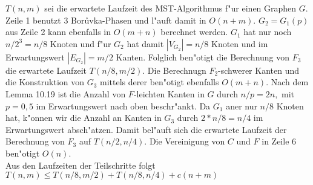 $T(n,m)$ sei die erwartete Laufzeit des MST-Algorithmus f"ur einen Graphen $G$.
    Zeile 1 benutzt 3 Bor\r uvka-Phasen und  l"auft damit in $O(n+m)$. 
    $G_2 = G_1(p)$ aus Zeile 2 kann ebenfalls in $O(m + n)$ berechnet werden.
    $G_1$ hat nur noch $n/2^3 = n/8$ Knoten und f"ur $G_2$ hat damit 
    $|V_{G_2}| = n/8$ Knoten und im Erwartungswert $|E_{G_2}| = m/2$ Kanten.
    Folglich ben"otigt die Berechnung von $F_3$  die erwartete Laufzeit 
    $T(n/8,m/2)$.
    Die Berechnugn $F_2$-schwerer Kanten und die Konstruktion von $G_3$ mittels
    derer ben"otigt ebenfalls $O(m+n)$.
    Nach dem Lemma 10.19 ist die Anzahl von $F$-leichten Kanten in $G$ durch
    $n/p = 2n,$ mit $p = 0,5$ im Erwartungswert nach oben beschr"ankt. Da $G_1$
    aner nur $n/8$ Knoten hat, k"onnen wir die Anzahl an Kanten in $G_3$
    durch $2*n/8 = n/4$ im Erwartungswert absch"atzen.
    Damit bel"auft sich die erwartete Laufzeit der Berechnung von $F_3$ auf
    $T(n/2, n/4)$.
    Die Vereinigung von $C$ und $F$ in Zeile 6 ben"otigt $O(n)$.\\
Aus den Laufzeiten der Teilschritte folgt
    $T(n,m) \leq T(n/8, m/2) + T(n/8, n/4) + c(n+m)$
    \\
